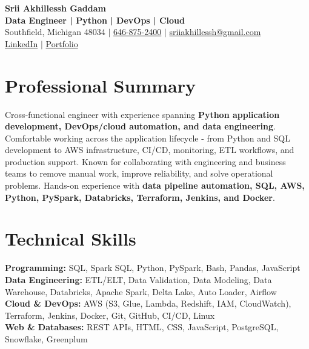 \documentclass[letterpaper,10pt]{article}
\begin{document}
\fontsize{9.35pt}{10.45pt}\selectfont

\begin{center}
    {\LARGE \textbf{Srii Akhillessh Gaddam}} \\[-1pt]
    \textbf{Data Engineer | Python | DevOps | Cloud} \\[2pt]
    Southfield, Michigan 48034 $|$
    \href{tel:6468752400}{646-875-2400} $|$
    \href{mailto:sriiakhillessh@gmail.com}{sriiakhillessh@gmail.com} \\[1pt]
    \href{https://www.linkedin.com/in/srii-akhiilessh-gaddam-b48668191/}{LinkedIn} $|$
    \href{https://sriiakhillesshg.github.io/portfolio/}{Portfolio}
\end{center}
\vspace{-8pt}

\section{Professional Summary}
\small{Cross-functional engineer with experience spanning \textbf{Python application development, DevOps/cloud automation, and data engineering}. Comfortable working across the application lifecycle - from Python and SQL development to AWS infrastructure, CI/CD, monitoring, ETL workflows, and production support. Known for collaborating with engineering and business teams to remove manual work, improve reliability, and solve operational problems. Hands-on experience with \textbf{data pipeline automation, SQL, AWS, Python, PySpark, Databricks, Terraform, Jenkins, and Docker}.}

\section{Technical Skills}
\small{
\textbf{Programming:} SQL, Spark SQL, Python, PySpark, Bash, Pandas, JavaScript \\
\textbf{Data Engineering:} ETL/ELT, Data Validation, Data Modeling, Data Warehouse, Databricks, Apache Spark, Delta Lake, Auto Loader, Airflow \\
\textbf{Cloud \& DevOps:} AWS (S3, Glue, Lambda, Redshift, IAM, CloudWatch), Terraform, Jenkins, Docker, Git, GitHub, CI/CD, Linux \\
\textbf{Web \& Databases:} REST APIs, HTML, CSS, JavaScript, PostgreSQL, Snowflake, Greenplum
}
\end{document}
